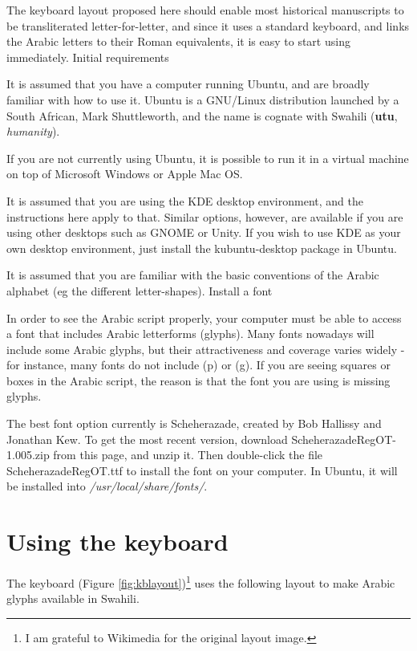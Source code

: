 \documentclass[a4paper,10pt, oneside]{book}
\newcommand\AS[1]{{\citationfont\RLE{#1}}}
\begin{document}
The keyboard layout proposed here should enable most historical manuscripts to be transliterated letter-for-letter, and since it uses a standard keyboard, and links the Arabic letters to their Roman equivalents, it is easy to start using immediately.
Initial requirements

It is assumed that you have a computer running Ubuntu, and are broadly familiar with how to use it. Ubuntu is a GNU/Linux distribution launched by a South African, Mark Shuttleworth, and the name is cognate with Swahili \AS{أُوتُ} (\textbf{utu}, \textit{humanity}).

If you are not currently using Ubuntu, it is possible to run it in a virtual machine on top of Microsoft Windows or Apple Mac OS.

It is assumed that you are using the KDE desktop environment, and the instructions here apply to that. Similar options, however, are available if you are using other desktops such as GNOME or Unity. If you wish to use KDE as your own desktop environment, just install the kubuntu-desktop package in Ubuntu.

It is assumed that you are familiar with the basic conventions of the Arabic alphabet (eg the different letter-shapes).
Install a font

In order to see the Arabic script properly, your computer must be able to access a font that includes Arabic letterforms (glyphs). Many fonts nowadays will include some Arabic glyphs, but their attractiveness and coverage varies widely - for instance, many fonts do not include \AS{پ} (p) or \AS{ڠ} (g). If you are seeing squares or boxes in the Arabic script, the reason is that the font you are using is missing glyphs.

The best font option currently is Scheherazade, created by Bob Hallissy and Jonathan Kew. To get the most recent version, download ScheherazadeRegOT-1.005.zip from this page, and unzip it. Then double-click the file ScheherazadeRegOT.ttf to install the font on your computer. In Ubuntu, it will be installed into \textit{/usr/local/share/fonts/}.


\chapter{Using the keyboard}

The keyboard (Figure \ref{fig:kblayout})\footnote{I am grateful to Wikimedia for the original layout image.} uses the following layout  to make Arabic glyphs available in Swahili.
\end{document}

